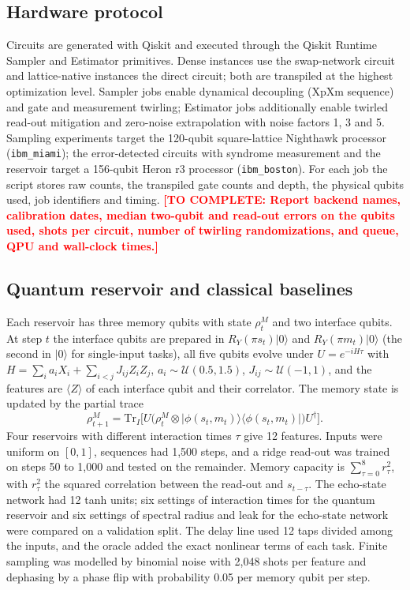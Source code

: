 \documentclass[12pt,a4paper]{article}
\newcommand{\todo}[1]{\textcolor{red}{\textbf{[TO COMPLETE: #1]}}}
\begin{document}
\subsection*{Hardware protocol}
Circuits are generated with Qiskit\cite{qiskit2024} and executed through the Qiskit Runtime Sampler and Estimator primitives. Dense instances use the swap-network circuit and lattice-native instances the direct circuit; both are transpiled at the highest optimization level. Sampler jobs enable dynamical decoupling (XpXm sequence) and gate and measurement twirling; Estimator jobs additionally enable twirled read-out mitigation and zero-noise extrapolation with noise factors 1, 3 and 5. Sampling experiments target the 120-qubit square-lattice Nighthawk processor (\texttt{ibm\_miami}); the error-detected circuits with syndrome measurement and the reservoir target a 156-qubit Heron r3 processor (\texttt{ibm\_boston}). For each job the script stores raw counts, the transpiled gate counts and depth, the physical qubits used, job identifiers and timing. \todo{Report backend names, calibration dates, median two-qubit and read-out errors on the qubits used, shots per circuit, number of twirling randomizations, and queue, QPU and wall-clock times.}

\subsection*{Quantum reservoir and classical baselines}
Each reservoir has three memory qubits with state $\rho^{M}_{t}$ and two interface qubits. At step $t$ the interface qubits are prepared in $R_{Y}(\pi s_{t})\lvert0\rangle$ and $R_{Y}(\pi m_{t})\lvert0\rangle$ (the second in $\lvert0\rangle$ for single-input tasks), all five qubits evolve under $U=e^{-iH\tau}$ with $H=\sum_{i}a_{i}X_{i}+\sum_{i<j}J_{ij}Z_{i}Z_{j}$, $a_{i}\sim\mathcal U(0.5,1.5)$, $J_{ij}\sim\mathcal U(-1,1)$, and the features are $\langle Z\rangle$ of each interface qubit and their correlator. The memory state is updated by the partial trace
\begin{equation}
\rho^{M}_{t+1}=\mathrm{Tr}_{I}\!\big[U\big(\rho^{M}_{t}\otimes\lvert\phi(s_{t},m_{t})\rangle\langle\phi(s_{t},m_{t})\rvert\big)U^{\dagger}\big].
\label{eq:collision}
\end{equation}
Four reservoirs with different interaction times $\tau$ give 12 features. Inputs were uniform on $[0,1]$, sequences had 1,500 steps, and a ridge read-out was trained on steps 50 to 1,000 and tested on the remainder. Memory capacity is $\sum_{\tau=0}^{8}r^{2}_{\tau}$, with $r^{2}_{\tau}$ the squared correlation between the read-out and $s_{t-\tau}$. The echo-state network had 12 tanh units; six settings of interaction times for the quantum reservoir and six settings of spectral radius and leak for the echo-state network were compared on a validation split. The delay line used 12 taps divided among the inputs, and the oracle added the exact nonlinear terms of each task. Finite sampling was modelled by binomial noise with 2,048 shots per feature and dephasing by a phase flip with probability 0.05 per memory qubit per step.
\end{document}

